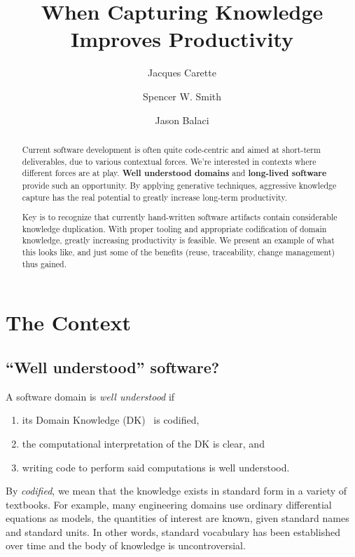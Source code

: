 \documentclass[a4paper,UKenglish,cleveref,autoref,thm-restate]{oasics-v2021}
\title{When Capturing Knowledge Improves Productivity}
\author{Jacques Carette}{Department of Computing and Software, McMaster University, 1280 Main Street West, Hamilton, Ontario, L8S 4L8, Canada \and \url{https://www.cas.mcmaster.ca/~carette/} }{carette@mcmaster.ca}{https://orcid.org/0000-0001-8993-9804}{}
\author{Spencer W. Smith}{Department of Computing and Software, McMaster University, 1280 Main Street West, Hamilton, Ontario, L8S 4L8, Canada \and \url{https://www.cas.mcmaster.ca/~smiths/} }{smiths@mcmaster.ca}{https://orcid.org/0000-0002-0760-0987}{}
\author{Jason Balaci}{Department of Computing and Software, McMaster University, 1280 Main Street West, Hamilton, Ontario, L8S 4L8, Canada}{balacij@mcmaster.ca}{}{}
\begin{document}
\maketitle

\begin{abstract}
    Current software development is often quite code-centric and aimed at
    short-term deliverables, due to various contextual forces. We're interested
    in contexts where different forces are at play.  \textbf{Well understood
    domains} and \textbf{long-lived software} provide such an opportunity. By
    applying generative techniques, aggressive knowledge capture has the real
    potential to greatly increase long-term productivity.
  
    Key is to recognize that currently hand-written software artifacts contain
    considerable knowledge duplication. With proper tooling and appropriate
    codification of domain knowledge, greatly increasing productivity is
    feasible. We present an example of what this looks like, and just some of
    the benefits (reuse, traceability, change management) thus gained.
\end{abstract}

\section{The Context}
\label{sec:the-context}

\subsection{``Well understood'' software?}
\label{subsec:well-understood}

\begin{definition}
\label{defn:well-understood}
A software domain is \emph{well understood} if
\begin{enumerate}
    \item its Domain Knowledge (DK)~\cite{bjorner2021domaineng} is codified,
    \item the computational interpretation of the DK is clear, and
    \item writing code to perform said computations is well understood.
\end{enumerate}
\end{definition}

By \emph{codified}, we mean that the knowledge exists in standard form in a
variety of textbooks. For example, many engineering domains use ordinary
differential equations as models, the quantities of interest are known, given
standard names and standard units. In other words, standard vocabulary has been
established over time and the body of knowledge is uncontroversial.
\end{document}
